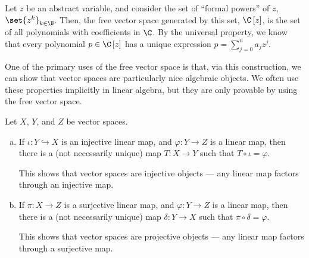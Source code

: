 \begin{example}
  Let $z$ be an abstract variable, and consider the set of ``formal powers'' of $z$, $\set{z^k}_{k\in\N}$. Then, the free vector space generated by this set, $\C\left[z\right]$, is the set of all polynomials with coefficients in $\C$. By the universal property, we know that every polynomial $p\in \C\left[z\right]$ has a unique expression $p = \sum_{j=0}^{n}a_jz^j$.
\end{example}
One of the primary uses of the free vector space is that, via this construction, we can show that vector spaces are particularly nice algebraic objects. We often use these properties implicitly in linear algebra, but they are only provable by using the free vector space.
\begin{theorem}
  Let $X$, $Y$, and $Z$ be vector spaces.
  \begin{enumerate}[(a)]
    \item If $\iota\colon Y\hookrightarrow X$ is an injective linear map, and $\varphi\colon Y\rightarrow Z$ is a linear map, then there is a (not necessarily unique) map $T\colon X\rightarrow Y$ such that $T\circ\iota = \varphi$.
      \begin{center}
      \end{center}
This shows that vector spaces are injective objects --- any linear map factors through an injective map.
    \item If $\pi\colon X\rightarrow Z$ is a surjective linear map, and $\varphi\colon Y\rightarrow Z$ is a linear map, then there is a (not necessarily unique) map $\delta\colon Y\rightarrow X$ such that $\pi\circ\delta = \varphi$.
      \begin{center}
      \end{center}
      This shows that vector spaces are projective objects --- any linear map factors through a surjective map.
  \end{enumerate}
\end{theorem}
